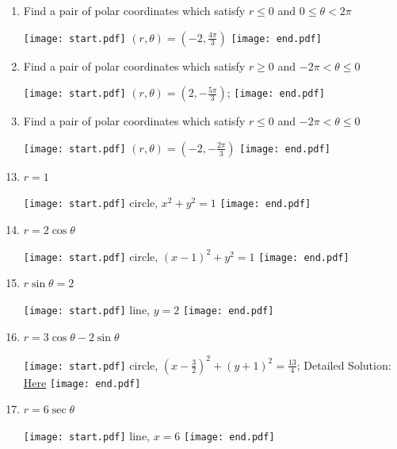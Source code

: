 \documentclass[12pt]{article}
\begin{document}
\begin{enumerate}
\begin{enumerate}
\item Find a pair of polar coordinates which satisfy $r \leq 0$ and $0 \leq \theta <2\pi$

\texttt{[image: start.pdf]}
{{$(r,\theta)=\left(-2,\frac{4\pi}{3}\right)$}}
\texttt{[image: end.pdf]}


\item Find a pair of polar coordinates which satisfy $r \geq 0$ and $-2\pi < \theta \leq 0$

\texttt{[image: start.pdf]}
{{$(r,\theta)=\left(2,-\frac{5\pi}{3}\right)$; }}
\texttt{[image: end.pdf]}


\item Find a pair of polar coordinates which satisfy $r \leq 0$ and $-2\pi < \theta \leq 0$

\texttt{[image: start.pdf]}
{{$(r,\theta)=\left(-2,-\frac{2\pi}{3}\right)$}}
\texttt{[image: end.pdf]}


\end{enumerate}

\end{enumerate}


\begin{enumerate}
\setcounter{enumi}{12}

\item $r=1$ 

\texttt{[image: start.pdf]}
{{circle, $x^2+y^2=1$}}
\texttt{[image: end.pdf]}


\item $r=2\cos{\theta}$ 

\texttt{[image: start.pdf]}
{{circle, $(x-1)^2+y^2=1$}}
\texttt{[image: end.pdf]}


\item $r\sin{\theta}=2$ 

\texttt{[image: start.pdf]}
{{line, $y=2$}}
\texttt{[image: end.pdf]}


\item $r=3\cos{\theta}-2\sin{\theta}$

\texttt{[image: start.pdf]}
{{circle, $\left(x-\frac{3}{2}\right)^2+(y+1)^2=\frac{13}{4}$; Detailed Solution: \textcolor{blue}{\href{http://www.math.drexel.edu/classes/Calculus/resources/Math122HW/Solutions/122_18_Polar_16.pdf}{Here}}}}
\texttt{[image: end.pdf]}


\item $r=6\sec{\theta}$

\texttt{[image: start.pdf]}
{{line, $x=6$}}
\texttt{[image: end.pdf]}


\end{enumerate}
\end{document}
